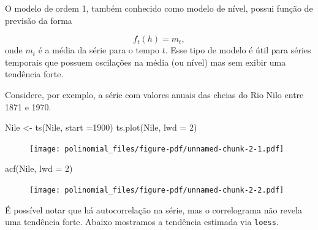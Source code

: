 \documentclass[
  letterpaper,
  DIV=11,
  numbers=noendperiod]{scrreprt}
\newenvironment{Shaded}{\begin{snugshade}}{\end{snugshade}}
\newcommand{\AttributeTok}[1]{\textcolor[rgb]{0.40,0.45,0.13}{#1}}
\newcommand{\DecValTok}[1]{\textcolor[rgb]{0.68,0.00,0.00}{#1}}
\newcommand{\FunctionTok}[1]{\textcolor[rgb]{0.28,0.35,0.67}{#1}}
\newcommand{\NormalTok}[1]{\textcolor[rgb]{0.00,0.23,0.31}{#1}}
\newcommand{\OtherTok}[1]{\textcolor[rgb]{0.00,0.23,0.31}{#1}}
\newcommand{\SpecialCharTok}[1]{\textcolor[rgb]{0.37,0.37,0.37}{#1}}
\newcommand{\StringTok}[1]{\textcolor[rgb]{0.13,0.47,0.30}{#1}}
\begin{document}
O modelo de ordem 1, também conhecido como modelo de nível, possui
função de previsão da forma

\[f_t(h)=m_t,\] onde \(m_t\) é a média da série para o tempo \(t\). Esse
tipo de modelo é útil para séries temporais que possuem oscilações na
média (ou nível) mas sem exibir uma tendência forte.

Considere, por exemplo, a série com valores anuais das cheias do Rio
Nilo entre 1871 e 1970.

\begin{Shaded}
\begin{Highlighting}[]
\NormalTok{Nile }\OtherTok{\textless{}{-}} \FunctionTok{ts}\NormalTok{(Nile, }\AttributeTok{start =}\DecValTok{1900}\NormalTok{)}
\FunctionTok{ts.plot}\NormalTok{(Nile, }\AttributeTok{lwd =} \DecValTok{2}\NormalTok{)}
\end{Highlighting}
\end{Shaded}

\begin{figure}[H]

{\centering \texttt{[image: polinomial\_files/figure-pdf/unnamed-chunk-2-1.pdf]}

}

\end{figure}

\begin{Shaded}
\begin{Highlighting}[]
\FunctionTok{acf}\NormalTok{(Nile, }\AttributeTok{lwd =} \DecValTok{2}\NormalTok{)}
\end{Highlighting}
\end{Shaded}

\begin{figure}[H]

{\centering \texttt{[image: polinomial\_files/figure-pdf/unnamed-chunk-2-2.pdf]}

}

\end{figure}

É possível notar que há autocorrelação na série, mas o correlograma não
revela uma tendência forte. Abaixo mostramos a tendência estimada via
\texttt{loess}.

\begin{Shaded}
\end{Shaded}
\end{document}
